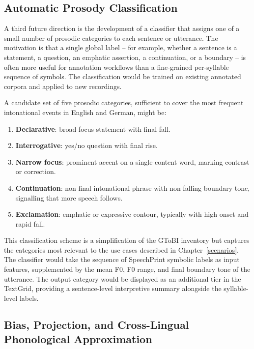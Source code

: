 \subsection{Automatic Prosody Classification}
\label{sec:prosody_classifier}

A third future direction is the development of a classifier that assigns one of a
small number of prosodic categories to each sentence or utterance. The motivation
is that a single global label -- for example, whether a sentence is a statement, a
question, an emphatic assertion, a continuation, or a boundary -- is often more
useful for annotation workflows than a fine-grained per-syllable sequence of
symbols. The classification would be trained on existing annotated corpora and
applied to new recordings.

A candidate set of five prosodic categories, sufficient to cover the most
frequent intonational events in English and German, might be:
\begin{enumerate}
\item \textbf{Declarative}: broad-focus statement with final fall.
\item \textbf{Interrogative}: yes/no question with final rise.
\item \textbf{Narrow focus}: prominent accent on a single content word,
      marking contrast or correction.
\item \textbf{Continuation}: non-final intonational phrase with
      non-falling boundary tone, signalling that more speech follows.
\item \textbf{Exclamation}: emphatic or expressive contour, typically with
      high onset and rapid fall.
\end{enumerate}

This classification scheme is a simplification of the GToBI inventory but
captures the categories most relevant to the use cases described in
Chapter~\ref{scenarios}. The classifier would take the sequence of SpeechPrint
symbolic labels as input features, supplemented by the mean F0, F0 range, and
final boundary tone of the utterance. The output category would be displayed as
an additional tier in the TextGrid, providing a sentence-level interpretive
summary alongside the syllable-level labels.

\subsection{Bias, Projection, and Cross-Lingual Phonological Approximation}
\label{sec:bias_projection}

